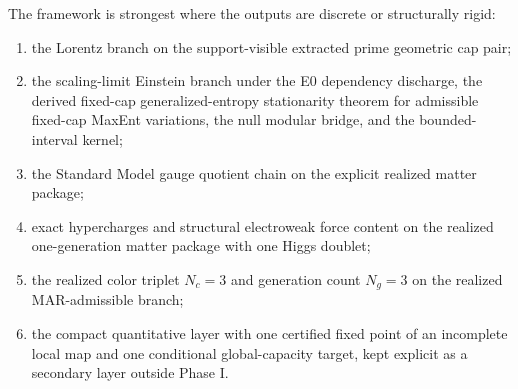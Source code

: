 \documentclass[11pt]{article}
\begin{document}
The framework is strongest where the outputs are discrete or structurally rigid:
\begin{enumerate}[leftmargin=2em]
\item the Lorentz branch on the support-visible extracted prime geometric cap pair;
\item the scaling-limit Einstein branch under the E0 dependency discharge, the derived fixed-cap generalized-entropy stationarity theorem for admissible fixed-cap MaxEnt variations, the null modular bridge, and the bounded-interval kernel;
\item the Standard Model gauge quotient chain on the explicit realized matter package;
\item exact hypercharges and structural electroweak force content on the realized one-generation matter package with one Higgs doublet;
\item the realized color triplet \(N_c=3\) and generation count \(N_g=3\) on the realized MAR-admissible branch;
\item the compact quantitative layer with one certified fixed point of an incomplete local map and
one conditional global-capacity target, kept explicit as a secondary layer outside Phase I.
\end{enumerate}
\end{document}
